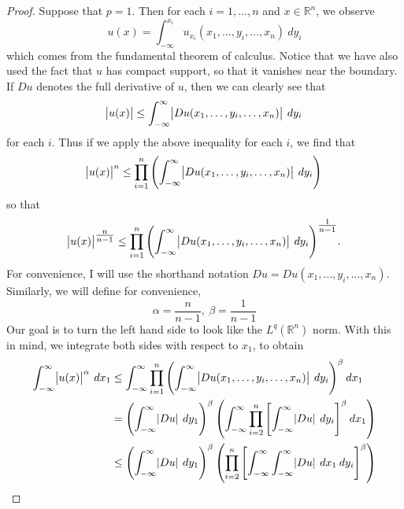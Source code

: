 \documentclass[10pt]{article}
\begin{document}
\begin{proof}
	Suppose that $p = 1$. Then for each $i = 1,\dots,n$ and $x \in \mathbb{R}^n$, we observe
	\begin{equation*}
		\displaystyle u(x) = \int_{-\infty}^{x_i}{u_{x_i}(x_1,\dots,y_i,\dots,x_n) \: dy_i}
	\end{equation*}
	which comes from the fundamental theorem of calculus. Notice that we have also used the fact that $u$ has compact support, so that it vanishes near the boundary. If $Du$ denotes the full derivative of $u$, then we can clearly see that 
	\begin{equation*}
		\displaystyle \abs{u(x)} \leq \int_{-\infty}^{\infty}{\abs{Du(x_1,\dots,y_i,\dots,x_n)} \: dy_i}
	\end{equation*}
	for each $i$. Thus if we apply the above inequality for each $i$, we find that 
	\begin{equation*}
		\displaystyle \abs{u(x)}^n \leq \prod\limits_{i = 1}^{n}{\left( \int_{-\infty}^{\infty}{\abs{Du(x_1,\dots,y_i,\dots,x_n)} \: dy_i} \right)}
	\end{equation*}
	so that 
	\begin{equation*}
		\displaystyle \abs{u(x)}^{\tfrac{n}{n-1}} \leq \prod\limits_{i = 1}^{n}{\left( \int_{-\infty}^{\infty}{\abs{Du(x_1,\dots,y_i,\dots,x_n)} \: dy_i} \right)^{\tfrac{1}{n-1}}}.
	\end{equation*}
	For convenience, I will use the shorthand notation $Du = Du(x_1,\dots,y_i,\dots,x_n)$. Similarly, we will define for convenience, 
	\begin{equation*}
		\displaystyle \alpha = \frac{n}{n-1}, \: \beta = \frac{1}{n-1}
	\end{equation*} 
	Our goal is to turn the left hand side to look like the $L^q(\mathbb{R}^n)$ norm. With this in mind, we integrate both sides with respect to $x_1$, to obtain
	\begin{align*}
		\displaystyle \int_{-\infty}^{\infty}{\abs{u(x)}^\alpha \: dx_1} &\leq \int_{-\infty}^{\infty}{\prod\limits_{i = 1}^{n}{\left( \int_{-\infty}^{\infty}{\abs{Du(x_1,\dots,y_i,\dots,x_n)} \: dy_i} \right)^{\beta}} \: dx_1} \\
		&= \left( \int_{-\infty}^{\infty}{\abs{Du} \: dy_1} \right)^\beta \left(\int_{-\infty}^{\infty}{\prod\limits_{i=2}^{n}{\left[\int_{-\infty}^{\infty}{\abs{Du} \: dy_i}\right]^\beta} \: dx_1}\right) \\
		&\leq \left( \int_{-\infty}^{\infty}{\abs{Du} \: dy_1} \right)^\beta \left( \prod\limits_{i=2}^{n}{\left[ \int_{-\infty}^{\infty}{\int_{-\infty}^{\infty}{\abs{Du} \: dx_1}} \: dy_i \right]^\beta} \right) \\

\end{align*}
\end{proof}
\end{document}
